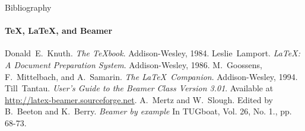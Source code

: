 \documentclass[aspectratio=169]{beamer}
\begin{document}
    \begin{frame}[label=bibliography]{Bibliography}
      \framesubtitle{\TeX, \LaTeX, and Beamer}
      \begin{thebibliography}{9}
            Donald~E.~Knuth.
            \emph{The \TeX book}.
            Addison-Wesley, 1984.
            Leslie~Lamport.
            \emph{\LaTeX : A Document Preparation System}.
            Addison-Wesley, 1986.
            M.~Goossens, F.~Mittelbach, and A.~Samarin.
            \emph{The \LaTeX\ Companion}.
            Addison-Wesley, 1994.
            Till~Tantau.
            \emph{User's Guide to the Beamer Class Version 3.01}.
            Available at \url{http://latex-beamer.sourceforge.net}.
            A.~Mertz and W.~Slough.
            Edited by B.~Beeton and K.~Berry.
            \emph{Beamer by example} In TUGboat,
              Vol. 26, No. 1., pp. 68-73.
      \end{thebibliography}
    \end{frame}
\end{document}
